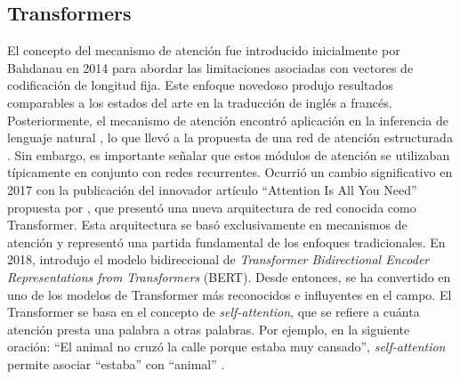 \subsection{Transformers}


El concepto del mecanismo de atención fue introducido inicialmente por Bahdanau en 2014 \citep{bahdanau2014neural} para abordar las limitaciones asociadas con vectores de codificación de longitud fija. Este enfoque novedoso produjo resultados comparables a los estados del arte en la traducción de inglés a francés. Posteriormente, el mecanismo de atención encontró aplicación en la inferencia de lenguaje natural \citep{parikh2016decomposable}, lo que llevó a la propuesta de una red de atención estructurada \citep{kim2017structured}. Sin embargo, es importante señalar que estos módulos de atención se utilizaban típicamente en conjunto con redes recurrentes. Ocurrió un cambio significativo en 2017 con la publicación del innovador artículo ``Attention Is All You Need'' propuesta por \cite{vaswani2017attention}, que presentó una nueva arquitectura de red conocida como Transformer. Esta arquitectura se basó exclusivamente en mecanismos de atención y representó una partida fundamental de los enfoques tradicionales. En 2018, \cite{devlin2018bert} introdujo el modelo bidireccional de \textit{Transformer Bidirectional Encoder Representations from Transformers} (BERT). Desde entonces, se ha convertido en uno de los modelos de Transformer más reconocidos e influyentes en el campo. El Transformer se basa en el concepto de \textit{self-attention}, que se refiere a cuánta atención presta una palabra a otras palabras. Por ejemplo, en la siguiente oración: ``El animal no cruzó la calle porque estaba muy cansado'', \textit{self-attention} permite asociar ``estaba'' con ``animal'' \citep{prince2023understanding}.


